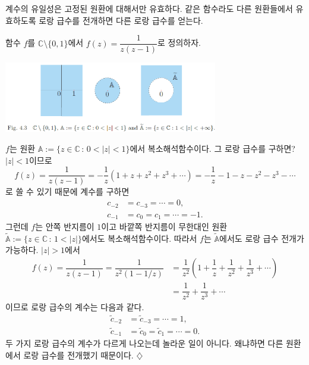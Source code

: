 계수의 유일성은 고정된 원환에 대해서만 유효하다.
같은 함수라도 다른 원환들에서 유효하도록 로랑 급수를 전개하면
다른 로랑 급수를 얻는다.

\begin{saltexample}{}{} \label{example-4-12}

함수 $f$를 $\mathbb C\setminus\{0,1\}$에서
$f(z) = \dfrac1{z(z-1)}$로 정의하자. 

\begin{center}
\includegraphics[width=0.7\textwidth]{./SaltChapter/fig-4-3}
\end{center}
\label{fig-4-3}
$f$는 원환 $\mathbb A:=\{ z\in \mathbb C\,:\, 0<|z|<1 \}$에서
복소해석함수이다. 그 로랑 급수를 구하면?
$|z|<1$이므로
\[
f(z) = \dfrac1{z(z-1)} %
= - \dfrac1z \left(1+z+z^2+ z^3 + \cdots \right)
= -\dfrac1z -1 -z -z^2 -z^3 - \cdots
\]
로 쓸 수 있기 때문에
계수를 구하면
\begin{align*}
c_{-2} &= c_{-3} = \cdots = 0, \\
c_{-1} & = c_0 = c_1 = \cdots = -1.
\end{align*}
그런데 $f$는 안쪽 반지름이 $1$이고 바깥쪽 반지름이 무한대인
원환 $\tilde{\mathbb A}:=\{ z\in \mathbb C\,:\, 1<|z| \}$에서도
복소해석함수이다. 따라서
$f$는 $\tilde{\mathbb A}$에서도 로랑 급수 전개가 가능하다.
$|z|>1$에서
\begin{align*}
f(z) = \dfrac1{z(z-1)} = \dfrac1{z^2(1-1/z)}
&= \dfrac1{z^2} \left( 1+ \dfrac1z + \dfrac1{z^2} + \dfrac1{z^3} + \cdots \right) \\
&= \dfrac 1{z^2} + \dfrac1{z^3} + \cdots
\end{align*}
이므로 로랑 급수의 계수는 다음과 같다.
\begin{align*}
\tilde c_{-2} &= \tilde c_{-3} = \cdots = 1, \\
\tilde c_{-1} & = \tilde c_0 = \tilde c_1 = \cdots = 0.
\end{align*}
두 가지 로랑 급수의 계수가 다르게 나오는데 놀라운 일이 아니다.
왜냐하면 다른 원환에서 로랑 급수를 전개했기 때문이다.
\hfill $\diamondsuit$
\end{saltexample}

